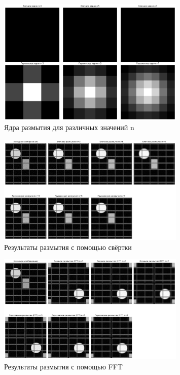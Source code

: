 \begin{figure}[H]
    \centering
    \includegraphics[width=0.8\textwidth]{images/task2/blur_kernels.png}
    \caption{Ядра размытия для различных значений n}
    \label{fig:blur_kernels}
\end{figure}

\begin{figure}[H]
    \centering
    \includegraphics[width=0.8\textwidth]{images/task2/convolution_results.png}
    \caption{Результаты размытия с помощью свёртки}
    \label{fig:convolution_blur}
\end{figure}

\begin{figure}[H]
    \centering
    \includegraphics[width=0.8\textwidth]{images/task2/fft_results.png}
    \caption{Результаты размытия с помощью FFT}
    \label{fig:fft_blur}
\end{figure}


